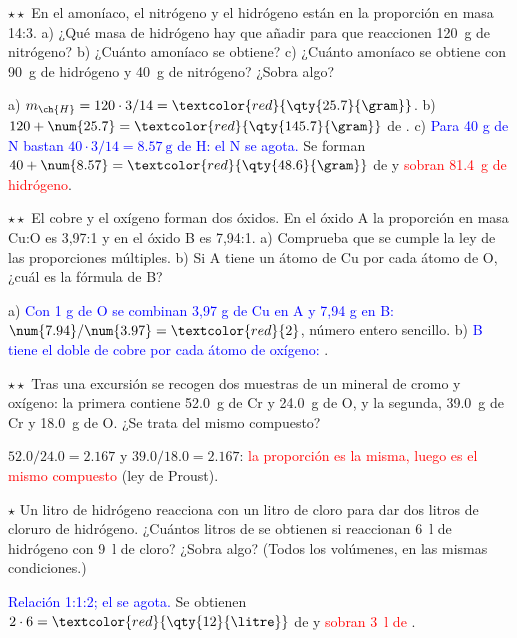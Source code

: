 \begin{exercise}
    \(\star\star\) En el amoníaco, el nitrógeno y el hidrógeno están en la proporción en masa 14:3. a) ¿Qué masa de hidrógeno
    hay que añadir para que reaccionen \qty{120}{\gram} de nitrógeno? b) ¿Cuánto amoníaco se obtiene? c) ¿Cuánto amoníaco
    se obtiene con \qty{90}{\gram} de hidrógeno y \qty{40}{\gram} de nitrógeno? ¿Sobra algo?
    \begin{solu}
        a) \(m_{\ch{H}} = 120 \cdot 3/14 = \textcolor{red}{\qty{25.7}{\gram}}\). b) \(120 + \num{25.7} = \textcolor{red}{\qty{145.7}{\gram}}\) de .
        c) \textcolor{blue}{Para 40 g de N bastan \(40 \cdot 3/14 = \qty{8.57}{\gram}\) de H: el N se agota.} Se forman
        \(40 + \num{8.57} = \textcolor{red}{\qty{48.6}{\gram}}\) de  y \textcolor{red}{sobran \qty{81.4}{\gram} de hidrógeno}.
    \end{solu}
\end{exercise}

\begin{exercise}
    \(\star\star\) El cobre y el oxígeno forman dos óxidos. En el óxido A la proporción en masa Cu:O es 3,97:1 y en el óxido B es
    7,94:1. a) Comprueba que se cumple la ley de las proporciones múltiples. b) Si A tiene un átomo de Cu por cada átomo de O,
    ¿cuál es la fórmula de B?
    \begin{solu}
        a) \textcolor{blue}{Con 1 g de O se combinan 3,97 g de Cu en A y 7,94 g en B:} \(\num{7.94}/\num{3.97} = \textcolor{red}{2}\), número entero
        sencillo. b) \textcolor{blue}{B tiene el doble de cobre por cada átomo de oxígeno:} \textcolor{red}{}.
    \end{solu}
\end{exercise}

\begin{exercise}
    \(\star\star\) Tras una excursión se recogen dos muestras de un mineral de cromo y oxígeno: la primera contiene
    \qty{52.0}{\gram} de Cr y \qty{24.0}{\gram} de O, y la segunda, \qty{39.0}{\gram} de Cr y \qty{18.0}{\gram} de O. ¿Se trata del
    mismo compuesto?
    \begin{solu}
        \(\num{52.0}/\num{24.0} = \num{2.167}\) y \(\num{39.0}/\num{18.0} = \num{2.167}\): \textcolor{red}{la proporción es la misma, luego es el
        mismo compuesto} (ley de Proust).
    \end{solu}
\end{exercise}

\begin{exercise}
    \(\star\) Un litro de hidrógeno reacciona con un litro de cloro para dar dos litros de cloruro de hidrógeno. ¿Cuántos litros
    de  se obtienen si reaccionan \qty{6}{\litre} de hidrógeno con \qty{9}{\litre} de cloro? ¿Sobra algo? (Todos los
    volúmenes, en las mismas condiciones.)
    \begin{solu}
        \textcolor{blue}{Relación 1:1:2; el  se agota.} Se obtienen \(2 \cdot 6 = \textcolor{red}{\qty{12}{\litre}}\) de  y
        \textcolor{red}{sobran \qty{3}{\litre} de }.
    \end{solu}
\end{exercise}


